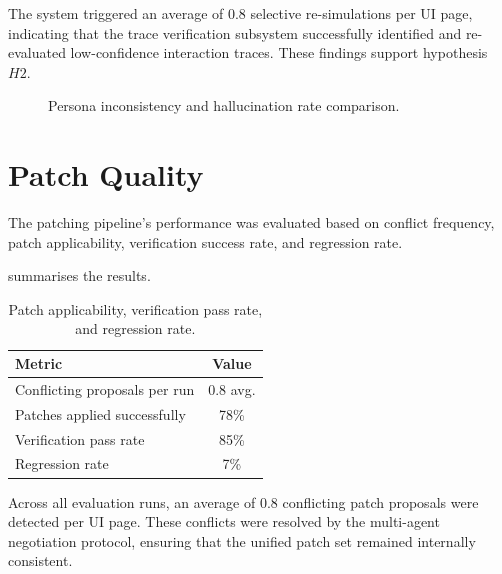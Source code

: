 The system triggered an average of 0.8 selective re-simulations per UI page, indicating that the trace verification subsystem successfully identified and re-evaluated low-confidence interaction traces. These findings support hypothesis~$H2$.

\begin{figure}[ht]
  \centering
  \caption{Persona inconsistency and hallucination rate comparison.}
  \label{fig:action-failure-timeline}
\end{figure}


\section{Patch Quality}
\label{sec:rq3-results}

The patching pipeline's performance was evaluated based on conflict frequency, patch applicability, verification success rate, and regression rate.

 summarises the results.

\begin{table}[htbp]
  \centering
  \caption{Patch applicability, verification pass rate, and regression rate.}
  \label{tab:patch-results}
  \begin{tabularx}{\textwidth}{@{}L{5cm} c@{}}
    \toprule
    \textbf{Metric} & \textbf{Value} \\
    \midrule
    Conflicting proposals per run         & 0.8 avg. \\
    Patches applied successfully          & 78\% \\
    Verification pass rate                & 85\% \\
    Regression rate                       & 7\% \\
    \bottomrule
  \end{tabularx}
\end{table}

Across all evaluation runs, an average of 0.8 conflicting patch proposals were detected per UI page. These conflicts were resolved by the multi-agent negotiation protocol, ensuring that the unified patch set remained internally consistent.

